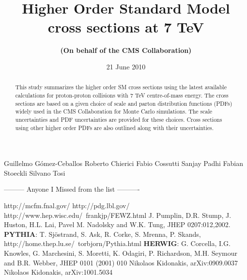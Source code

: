 \documentclass{cmspaper_pdf}
\begin{document}

\begin{titlepage}

  \date{21 June 2010}

  \title{Higher Order Standard Model cross sections at 7 TeV}

  \begin{Authlist}
    Guillelmo G\'omez-Ceballos 
     Roberto Chierici
    Fabio Cossutti 
    Sanjay Padhi
    Fabian Stoeckli
    Silvano Tosi

--------- Anyone I Missed from the list ----------

  \end{Authlist}

  \author{\bf(On behalf of the CMS Collaboration)}

  \begin{abstract}
This study summarizes the higher order SM cross sections using the latest 
available calculations for proton-proton collisions with 7 TeV centre-of-mass 
energy. The cross sections are based on a given choice of scale and parton 
distribution functions (PDFs) widely used in the CMS Collaboration for Monte 
Carlo simulations. The scale uncertainties and PDF uncertainties are provided 
for these choices. Cross sections using other higher order PDFs are also 
outlined along with their uncertainties.
  \end{abstract}

\end{titlepage}

\setcounter{page}{2}%

%






\begin{thebibliography}{9}

http://mcfm.fnal.gov/
http://pdg.lbl.gov/
http://www.hep.wisc.edu/~frankjp/FEWZ.html
 J. Pumplin, D.R. Stump, J. Huston, H.L. Lai, Pavel M. Nadolsky and W.K. Tung, JHEP 0207:012,2002. 
 \textbf{PYTHIA}: T. Sj\"ostrand, S. Ask, R. Corke, S. Mrenna, P. Skands, http://home.thep.lu.se/~torbjorn/Pythia.html
 \textbf{HERWIG}: G. Corcella, I.G. Knowles, G. Marchesini, S. Moretti, K. Odagiri, P. Richardson, M.H. Seymour and B.R. Webber, JHEP 0101 (2001) 010
 Nikolaos Kidonakis, arXiv:0909.0037
 Nikolaos Kidonakis, arXiv:1001.5034
 
\end{thebibliography}
\end{document}
